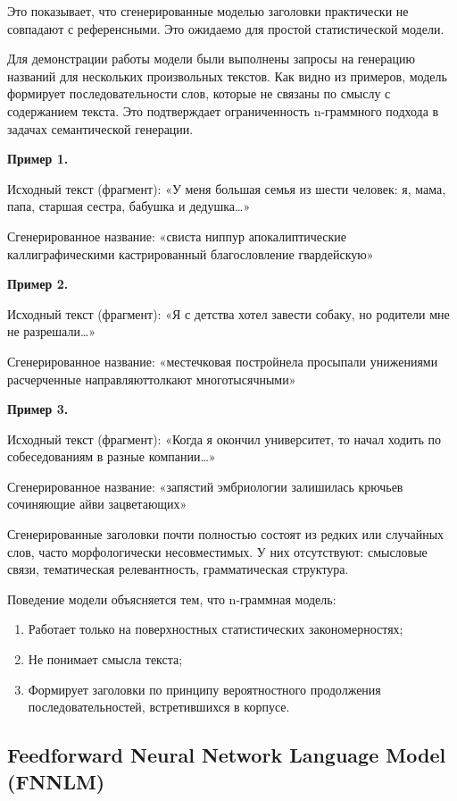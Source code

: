 \documentclass[coursework]{SCWorks}
\begin{document}
    Это показывает, что сгенерированные моделью заголовки практически не совпадают с референсными.
    Это ожидаемо для простой статистической модели.


    Для демонстрации работы модели были выполнены запросы на генерацию названий для нескольких произвольных текстов.
    Как видно из примеров, модель формирует последовательности слов, которые не связаны по смыслу с содержанием текста.
    Это подтверждает ограниченность n-граммного подхода в задачах семантической генерации.


    \textbf{Пример 1.}

    Исходный текст (фрагмент):
    «У меня большая семья из шести человек: я, мама, папа, старшая сестра, бабушка и дедушка…»

    Сгенерированное название:
    «свиста ниппур апокалиптические каллиграфическими кастрированный благословление гвардейскую»


    \textbf{Пример 2.}

    Исходный текст (фрагмент):
    «Я с детства хотел завести собаку, но родители мне не разрешали…»

    Сгенерированное название:
    «местечковая постройнела просыпали унижениями расчерченные направляюттолкают многотысячными»


    \textbf{Пример 3.}

    Исходный текст (фрагмент):
    «Когда я окончил университет, то начал ходить по собеседованиям в разные компании…»

    Сгенерированное название:
    «запястий эмбриологии залишилась крючьев сочиняющие айви зацветающих»

    Сгенерированные заголовки почти полностью состоят из редких или случайных слов, часто морфологически несовместимых.
    У них отсутствуют: смысловые связи, тематическая релевантность, грамматическая структура.

    Поведение модели объясняется тем, что n-граммная модель:
    \begin{enumerate}
        \item Работает только на поверхностных статистических закономерностях;
        \item Не понимает смысла текста;
        \item Формирует заголовки по принципу вероятностного продолжения последовательностей, встретившихся в корпусе.
    \end{enumerate}

    \subsection{Feedforward Neural Network Language Model (FNNLM)}
\end{document}
